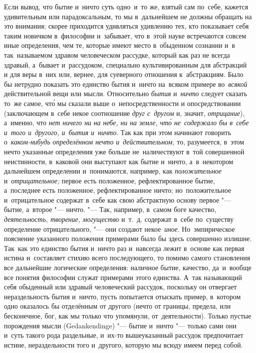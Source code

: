 Если вывод, что бытие и~ничто суть одно~и~то же, взятый сам по~себе, кажется
удивительным или парадоксальным, то мы в~дальнейшем не должны обращать на это
внимания; скорее приходится удивляться удивлению тех, кто показывает себя таким
новичком в~философии и~забывает, что в~этой науке встречаются совсем иные
определения, чем те, которые имеют место в~обыденном сознании и~в
так~называемом здравом человеческом рассудке, который как раз не всегда
здравый, а~бывает и~рассудоком, специально культивированным для абстракций и
для веры в~них или, вернее, для суеверного отношения к~абстракциям. Было бы
нетрудно показать это единство бытия и~ничто на~всяком примере во~{\em всякой}
действительной вещи или мысли. Относительно {\em бытия} и~{\em ничто} следует
сказать то~же самое, чт\'{о} мы сказали выше о~непосредственности и
опосредствовании (заключающем в~себе некое соотношение {\em друг с~другом} и,
значит, {\em отрицание}), а~именно, что {\em нет ничего ни на небе, ни на
земле, чт\'{о} не~содержало бы в~себе и~того и~другого, и~бытия и~ничто}. Так
как при этом начинают говорить о~{\em каком-нибудь определённом нечто
и~действительном,} то, разумеется, в~этом нечто указанные определения уже
больше не~наличествуют в~той совершенной неистинности, в~каковой они выступают
как бытие и~ничто, а~в~некотором дальнейшем определении и~понимаются, например,
как {\em положительное} и~{\em отрицательное;} первое есть положенное,
рефлектированное бытие, а~последнее есть положенное, рефлектированное ничто;
но~положительное и~отрицательное содержат в~себе как свою абстрактную основу
первое "--- бытие, а~второе "--- ничто. "--- Так, например, в~самом боге
качество, {\em деятельность, творение, могущество} и~т.~д. содержат в~себе
по~существу определение отрицательного, "--- они создают некое~{\em иное}.
Но~эмпирическое пояснение указанного положения примерами было бы здесь
совершенно излишне. Так~как это единство бытия и~ничто раз и~навсегда лежит
в~основе как первая истина и~составляет стихию всего последующего, то помимо
самого становления все дальнейшие логические определения: наличное бытие,
качество, да~и~вообще все понятия философии служат примерами этого единства.
А~так называющий себя обыденный или здравый человеческий рассудок, поскольку он
отвергает нераздельность бытия и~ничто, пусть попытается отыскать пример,
в~котором одно оказалось бы отделённым от другого (нечто от границы, предела,
или бесконечное, бог, как мы только что упомянули, от~деятельности). Только
пустые порождения мысли (Gedank\-end\-inge) "--- бытие и~ничто "--- только сами
они и~суть такого рода раздельные, и~их-то вышеуказанный рассудок предпочитает
истине, нераздельности того и~другого, которую мы всюду имеем перед собой.


